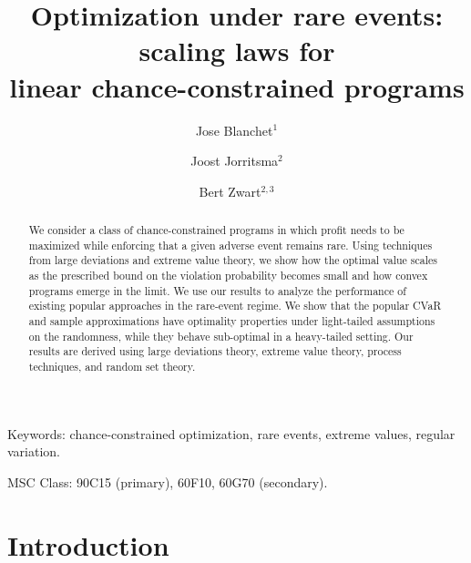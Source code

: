 \documentclass[a4paper, a4wide, 10pt, reqno]{amsart}
\title[Scaling laws for linear chance-constrained programs]{Optimization under rare events: 
scaling laws for \\linear chance-constrained programs}
\author[J. Blanchet]{Jose Blanchet$^1$}
\author[J. Jorritsma]{Joost Jorritsma$^2$}
\author[B. Zwart]{Bert Zwart$^{2,3}$}
\theoremstyle{plain}
\begin{document}
\begin{abstract}%
We consider a class of chance-constrained programs in which profit needs to be maximized while enforcing that a given adverse event remains rare. Using techniques from large deviations and extreme value theory, we show how the optimal value scales as the prescribed bound on the violation probability becomes small and how convex programs emerge in the limit. We use our results to analyze the performance of existing popular approaches in the rare-event regime. We show that the popular CVaR and sample approximations have optimality properties under light-tailed assumptions on the randomness, while they behave sub-optimal in a heavy-tailed setting. Our results are derived using large deviations theory, extreme value theory, process techniques, and random set theory.
\end{abstract}
\maketitle
\vspace*{-0.4cm}
{\footnotesize
\hspace{1em}Keywords: chance-constrained optimization, rare events, extreme values, regular variation.

\hspace{1em}MSC Class: 90C15 (primary), 60F10, 60G70 (secondary).
}


\section{Introduction}
\end{document}

